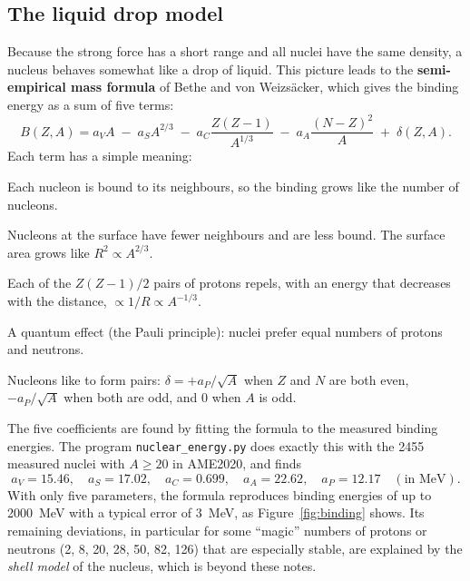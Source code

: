 \documentclass[11pt,a4paper]{article}
\begin{document}
\subsection{The liquid drop model}
\label{sec:liquid}

Because the strong force has a short range and all nuclei have the same density, a nucleus behaves somewhat like a drop of liquid. This picture leads to the \textbf{semi-empirical mass formula} of Bethe and von Weizsäcker, which gives the binding energy as a sum of five terms:
\begin{equation}
  B(Z,A) = a_V A \;-\; a_S A^{2/3} \;-\; a_C \frac{Z(Z-1)}{A^{1/3}} \;-\; a_A \frac{(N-Z)^2}{A} \;+\; \delta(Z,A).
  \label{eq:semf}
\end{equation}
Each term has a simple meaning:
\begin{description}[leftmargin=1em]
  \item[Volume term $a_V A$.] Each nucleon is bound to its neighbours, so the binding grows like the number of nucleons.
  \item[Surface term $-a_S A^{2/3}$.] Nucleons at the surface have fewer neighbours and are less bound. The surface area grows like $R^2 \propto A^{2/3}$.
  \item[Coulomb term $-a_C Z(Z-1)/A^{1/3}$.] Each of the $Z(Z-1)/2$ pairs of protons repels, with an energy that decreases with the distance, $\propto 1/R \propto A^{-1/3}$.
  \item[Asymmetry term $-a_A (N-Z)^2/A$.] A quantum effect (the Pauli principle): nuclei prefer equal numbers of protons and neutrons.
  \item[Pairing term $\delta$.] Nucleons like to form pairs: $\delta = +a_P/\sqrt{A}$ when $Z$ and $N$ are both even, $-a_P/\sqrt{A}$ when both are odd, and $0$ when $A$ is odd.
\end{description}
The five coefficients are found by fitting the formula to the measured binding energies. The program \texttt{nuclear\_energy.py} does exactly this with the 2455 measured nuclei with $A \geq 20$ in AME2020, and finds
\[
a_V = 15.46, \quad a_S = 17.02, \quad a_C = 0.699, \quad a_A = 22.62, \quad a_P = 12.17 \quad (\text{in MeV}).
\]
With only five parameters, the formula reproduces binding energies of up to 2000~MeV with a typical error of 3~MeV, as Figure~\ref{fig:binding} shows. Its remaining deviations, in particular for some ``magic'' numbers of protons or neutrons (2, 8, 20, 28, 50, 82, 126) that are especially stable, are explained by the \emph{shell model} of the nucleus, which is beyond these notes.
\end{document}
